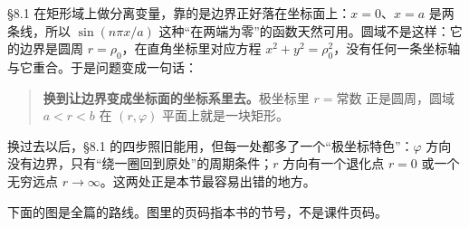 
\label{sec:82}



\S8.1 在矩形域上做分离变量，靠的是边界正好落在坐标面上：$x=0$、$x=a$ 是两条线，所以 $\sin(n\pi x/a)$ 这种“在两端为零”的函数天然可用。圆域不是这样：它的边界是圆周 $r=\rho_0$，在直角坐标里对应方程 $x^2+y^2=\rho_0^2$，没有任何一条坐标轴与它重合。于是问题变成一句话：

\begin{quote}
\textbf{换到让边界变成坐标面的坐标系里去。}极坐标里 $r=\text{常数}$ 正是圆周，圆域 $a<r<b$ 在 $(r,\varphi)$ 平面上就是一块矩形。
\end{quote}

换过去以后，\S8.1 的四步照旧能用，但每一处都多了一个“极坐标特色”：$\varphi$ 方向没有边界，只有“绕一圈回到原处”的周期条件；$r$ 方向有一个退化点 $r=0$ 或一个无穷远点 $r\to\infty$。这两处正是本节最容易出错的地方。

下面的图是全篇的路线。图里的页码指本书的节号，不是课件页码。

